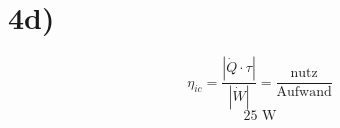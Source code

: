 

\section*{4d)}
\[
\eta_{ic} = \frac{|\dot{Q} \cdot \tau|}{|\dot{W}|} = \frac{\text{nutz}}{\text{Aufwand}}
\]
\[
\text{25 W}
\]
